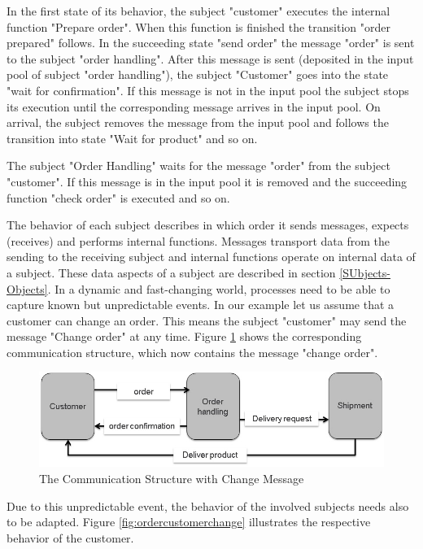 In the first state of its behavior, the subject "customer" executes the internal function "Prepare order". When this function is finished the transition "order prepared" follows. In the succeeding state "send order" the message "order" is sent to the subject "order handling". After this message is sent (deposited in the input pool of subject "order handling"), the subject "Customer" goes into the state "wait for confirmation". If this message is not in the input pool the subject stops its execution until the corresponding message arrives in the input pool. On arrival, the subject removes the message from the input pool and follows the transition into state "Wait for product" and so on.

The subject "Order Handling" waits for the message "order" from the subject "customer". If this message is in the input pool it is removed and the succeeding function "check order" is executed and so on.

The behavior of each subject describes in which order it sends messages, expects (receives) and performs internal functions. Messages transport data from the sending to the receiving subject and internal functions operate on internal data of a subject. These data aspects of a subject are described in section \ref{SUbjects-Objects}. In a dynamic and fast-changing world, processes need to be able to capture known but unpredictable events. In our example let us assume that a customer can change an order. This means the subject "customer" may send the message "Change order" at any time. Figure \ref{fig:ordercomstructure2} shows the corresponding communication structure, which now contains the message "change order".

\begin{figure}[htbp]
	\centering
	\includegraphics[width=0.7\linewidth]{Figures/Ontology/SubjectExecution/OrderComStructure}
	\caption[The Communication Structure with Change Message]{The Communication Structure with Change Message}
	\label{fig:ordercomstructure2}
\end{figure}

Due to this unpredictable event, the behavior of the involved subjects needs also to be adapted. Figure \ref{fig:ordercustomerchange} illustrates the respective behavior of the customer. 


